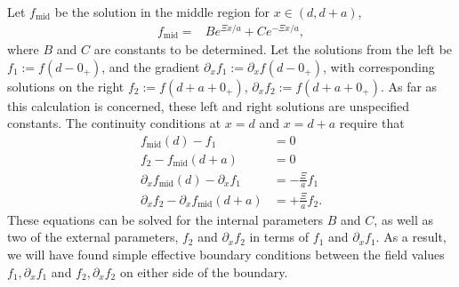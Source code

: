 Let $f_{\text{mid}}$ be the solution in the middle region for $x\in(d,d+a)$,   
    \begin{align}
      f_{\text{mid}} %
      =& Be^{\Xi x/a} + C e^{-\Xi x/a},
    \end{align}
    where $B$ and $C$ are constants to be determined.
    Let the solutions from the left be $f_1:=f(d-0_+)$, and the gradient $\partial_x f_1:=\partial_x f(d-0_+)$,
    with corresponding solutions on the right $f_2:=f(d+a+0_+)$, $\partial_x f_2:=f(d+a+0_+)$.  As far as this 
    calculation is concerned, these left and right solutions are unspecified constants. 
    The continuity conditions at $x=d$ and $x=d+a$ require that
    \begin{subequations}
      \begin{align}
        f_{\text{mid}}(d)-f_1 &= 0 \label{eq:f1}\\
        f_2- f_{\text{mid}}(d+a)&= 0 \label{eq:f2}\\
        \partial_xf_{\text{mid}}(d) -\partial_xf_1&= -\frac{\Xi}{a} f_1\label{eq:f1'}\\
        \partial_x f_2 -\partial_x f_{\text{mid}}(d+a)&= +\frac{\Xi}{a} f_2.\label{eq:f2'}
      \end{align}
    \end{subequations}
   These equations can be solved for the internal parameters $B$ and $C$, as well as two of the external 
   parameters, $f_2$ and $\partial_x f_2$ in terms of $f_1$ and $\partial_x f_1$.
   As a result, we will have found simple effective boundary conditions between
   the field values $f_1,\partial_xf_1$ and $f_2,\partial_xf_2$ on either side of the boundary.

